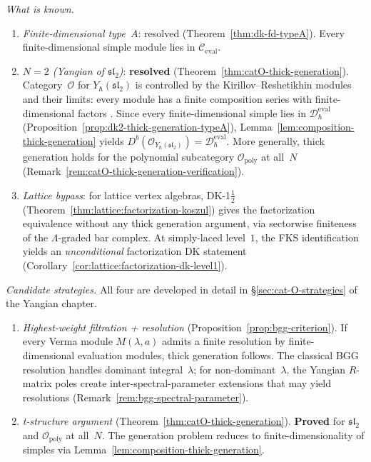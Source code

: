 \begin{remark}
\emph{What is known.}

\begin{enumerate}[label=\textup{(\alph*)}]
\item \emph{Finite-dimensional type~$A$}: resolved
  (Theorem~\ref{thm:dk-fd-typeA}).  Every finite-dimensional simple
  module lies in $\mathcal{C}_{\mathrm{eval}}$.
\item \emph{$N = 2$ (Yangian of $\mathfrak{sl}_2$)}: \textbf{resolved}
  (Theorem~\ref{thm:catO-thick-generation}).
  Category~$\mathcal{O}$ for $Y_\hbar(\mathfrak{sl}_2)$ is controlled
  by the Kirillov--Reshetikhin modules and their limits: every module
  has a finite composition series with finite-dimensional factors
  \cite{ChariPressley94}.  Since every finite-dimensional simple
  lies in $\mathcal{D}_\hbar^{\mathrm{eval}}$
  (Proposition~\ref{prop:dk2-thick-generation-typeA}),
  Lemma~\ref{lem:composition-thick-generation} yields
  $D^b(\mathcal{O}_{Y_\hbar(\mathfrak{sl}_2)})
  = \mathcal{D}_\hbar^{\mathrm{eval}}$.
  More generally, thick generation holds for the polynomial
  subcategory $\mathcal{O}_{\mathrm{poly}}$ at all~$N$
  (Remark~\ref{rem:catO-thick-generation-verification}).
\item \emph{Lattice bypass}: for lattice vertex algebras,
  DK-1$\frac{1}{2}$ (Theorem~\ref{thm:lattice:factorization-koszul})
  gives the factorization equivalence without any thick generation
  argument, via sectorwise finiteness of the $\Lambda$-graded bar complex.
  At simply-laced level~$1$, the FKS identification
  yields an \emph{unconditional} factorization DK statement
  (Corollary~\ref{cor:lattice:factorization-dk-level1}).
\end{enumerate}

\emph{Candidate strategies.}  All four are developed in detail in
\S\ref{sec:cat-O-strategies} of the Yangian chapter.
\begin{enumerate}[label=\textup{(\roman*)}]
\item \emph{Highest-weight filtration + resolution}
  (Proposition~\ref{prop:bgg-criterion}).
  If every Verma module $M(\lambda, a)$ admits a finite resolution
  by finite-dimensional evaluation modules, thick generation follows.
  The classical BGG resolution handles dominant integral~$\lambda$;
  for non-dominant~$\lambda$, the Yangian $R$-matrix poles create
  inter-spectral-parameter extensions that may yield resolutions
  (Remark~\ref{rem:bgg-spectral-parameter}).

\item \emph{t-structure argument}
  (Theorem~\ref{thm:catO-thick-generation}).
  \textbf{Proved} for $\mathfrak{sl}_2$ and
  $\mathcal{O}_{\mathrm{poly}}$ at all~$N$.  The generation
  problem reduces to finite-dimensionality of simples via
  Lemma~\ref{lem:composition-thick-generation}.


\end{enumerate}
\end{remark}
